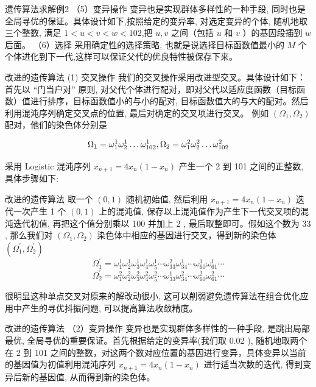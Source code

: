 \documentclass[xcolor=table,dvipsnames,svgnames,aspectratio=169,fontset=ubuntu]{ctexbeamer}
\let\quad\relax
\begin{document}
\begin{frame}{遗传算法求解例2}
  （5）变异操作
  \vskip 5pt
变异也是实现群体多样性的一种手段, 同时也是全局寻优的保证。具体设计如下,按照给定的变异率, 对选定变异的个体, 随机地取三个整数, 满足 $1<u<v<w<102$,把 $u, v$ 之间（包括 $u$ 和 $v$ ）的基因段插到 $w$ 后面。
\vskip 15pt
（6）选择
\vskip 5pt
采用确定性的选择策略, 也就是说选择目标函数值最小的 $M$ 个个体进化到下一代,这样可以保证父代的优良特性被保存下来。
\end{frame}

\begin{frame}{改进的遗传算法}
  (1) 交叉操作
\vskip 5pt
我们的交叉操作采用改进型交叉。具体设计如下：首先以 “门当户对” 原则, 对父代个体进行配对，即对父代以适应度函数（目标函数）值进行排序，目标函数值小的与小的配对, 目标函数值大的与大的配对。然后利用混沌序列确定交叉点的位置, 最后对确定的交叉项进行交叉。
\vskip 5pt
例如 $\left(\Omega_1, \Omega_2\right)$ 配对，他们的染色体分别是 

$$\Omega_1=\omega_1^1 \omega_2^1 \ldots \omega_{102}^1,\quad \Omega_2=\omega_1^2 \omega_2^2 \ldots \omega_{102}^2$$

采用 Logistic 混沌序列 $x_{n+1}=4 x_{n}(1-x_{n})$ 产生一个 2 到 101 之间的正整数, 具体步骤如下:
\end{frame}

\begin{frame}{改进的遗传算法}
  取一个 $(0,1)$ 随机初始值, 然后利用 $x_{n+1}=4 x_{n}(1-x_{n})$ 迭代一次产生 1 个 $(0,1)$ 上的混沌值, 保存以上混沌值作为产生下一代交叉项的混沌迭代初值, 再把这个值分别乘以 100 并加上 2 , 最后取整即可。假如这个数为 33 , 那么我们对 $\left(\Omega_1, \Omega_2\right)$ 染色体中相应的基因进行交叉，得到新的染色体 $\left(\Omega_1^{\prime}, \Omega_2^{\prime}\right)$
$$
\Omega_1^{\prime}=\omega_1^1 \omega_2^1 \omega_3^1 \omega_4^1 \omega_5^1 \cdots \omega_{33}^2 \omega_{34}^1 \cdots \omega_{60}^1 \omega_{61}^1 \cdots
$$
$$
\Omega_2^{\prime}=\omega_1^2 \omega_2^2 \omega_3^2 \omega_4^2 \omega_5^2 \cdots \omega_{33}^1 \omega_{34}^2 \cdots \omega_{60}^2 \omega_{61}^2 \cdots
$$

很明显这种单点交叉对原来的解改动很小, 这可以削弱避免遗传算法在组合优化应用中产生的寻优抖振问题, 可以提高算法收敛精度。
\end{frame}

\begin{frame}{改进的遗传算法}
  （2）变异操作
  \vskip 5pt
变异也是实现群体多样性的一种手段, 是跳出局部最优, 全局寻优的重要保证。首先根据给定的变异率(我们取 0.02 ), 随机地取两个在 2 到 101 之间的整数，对这两个数对应位置的基因进行变异，具体变异以当前的基因值为初值利用混沌序列 $x_{n+1}=4 x_{n}(1-x_{n})$ 进行适当次数的迭代, 得到变异后新的基因值, 从而得到新的染色体。
\end{frame}
\end{document}

